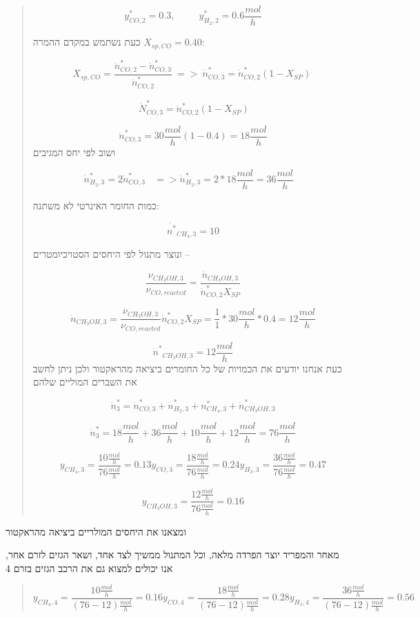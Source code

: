 \documentclass[
  hebrew,
  letterpaper,
  DIV=11,
  numbers=noendperiod]{scrreprt}
\begin{document}
\begin{quote}
\[y_{CO,2}^{*} = 0.3,\ \ \ \ \ \ \ \ \ \ \ y_{H_{2},2}^{*} = 0.6\frac{mol}{h}\]

כעת נשתמש במקדם ההמרה \(X_{sp,CO} = 0.40\):

\[X_{sp,CO} = \frac{{\dot{n}}_{CO,2}^{*} - {\dot{n}}_{CO,3}^{*}}{{\dot{n}}_{CO,2}^{*}}\  = > \ {\dot{n}}_{CO,3}^{*} = {\dot{n}}_{CO,2}^{*}\left( 1 - X_{SP} \right)\ \]

\[\ {\dot{N}}_{CO,3}^{*} = {\dot{n}}_{CO,2}^{*}\left( 1 - X_{SP} \right)\]

\[{\dot{n}}_{CO,3}^{*} = 30\frac{mol}{h}(1 - 0.4) = 18\frac{mol}{h}\]
ושוב לפי יחס המגיבים

\[{\dot{n}}_{H_{2},3}^{*} = 2{\dot{n}}_{CO,3}^{*}\ \ \ \  = > {\dot{n}}_{H_{2},3}^{*} = 2*18\frac{mol}{h} = 36\frac{mol}{h}\ \ \ \ \]

כמות החומר האינרטי לא משתנה:

\[{\dot{n^{*}}}_{CH_{4},3} = 10\]

ונוצר מתנול לפי היחסים הסטויכיומטרים --

\[\frac{\nu_{CH_{3}OH,3}}{\nu_{CO,reacted}} = \frac{{\dot{n}}_{CH_{3}OH,3}}{{\dot{n}}_{CO,2}^{*}X_{SP}}\]

\[{\dot{n}}_{CH_{3}OH,3} = \frac{\nu_{CH_{3}OH,3}}{\nu_{CO,reacted}}{\dot{n}}_{CO,2}^{*}X_{SP} = \frac{1}{1}*30\frac{mol}{h}*0.4 = 12\frac{mol}{h}\]

\[{{\dot{n}}^{*}}_{CH_{3}OH,3} = 12\frac{mol}{h}\] כעת אנחנו יודעים את
הכמויות של כל החומרים ביציאה מהראקטור ולכן ניתן לחשב את השברים המוליים
שלהם

\[{\dot{n}}_{3}^{*} = {\dot{n}}_{CO,3}^{*} + {\dot{n}}_{H_{2},3}^{*} + n_{CH_{4},3}^{*} + {\dot{n}}_{CH_{3}OH,3}^{*}\]

\[{\dot{n}}_{3}^{*} = 18\frac{mol}{h} + 36\frac{mol}{h} + 10\frac{mol}{h} + 12\frac{mol}{h} = 76\frac{mol}{h}\]

\[{y_{CH_{4},3} = \frac{10\frac{mol}{h}}{76\frac{mol}{h}} = 0.13
}{y_{CO,3} = \frac{18\frac{mol}{h}}{76\frac{mol}{h}} = 0.24
}{y_{H_{2},3} = \frac{36\frac{mol}{h}}{76\frac{mol}{h}} = 0.47}\]

\[y_{CH_{3}OH,3} = \frac{12\frac{mol}{h}}{76\frac{mol}{h}} = 0.16\]
\end{quote}

ומצאנו את היחסים המולריים ביציאה מהראקטור

מאחר והמפריד יוצר הפרדה מלאה, וכל המתנול ממשיך לצד אחד, ושאר הגזים לזרם
אחר, אנו יכולים למצוא גם את הרכב הגזים בזרם 4

\begin{quote}
\[{y_{CH_{4},4} = \frac{10\frac{mol}{h}}{(76 - 12)\frac{mol}{h}} = 0.16
}{y_{CO,4} = \frac{18\frac{mol}{h}}{(76 - 12)\frac{mol}{h}} = 0.28
}{y_{H_{2},4} = \frac{36\frac{mol}{h}}{(76 - 12)\frac{mol}{h}} = 0.56}\]
\end{quote}
\end{document}
